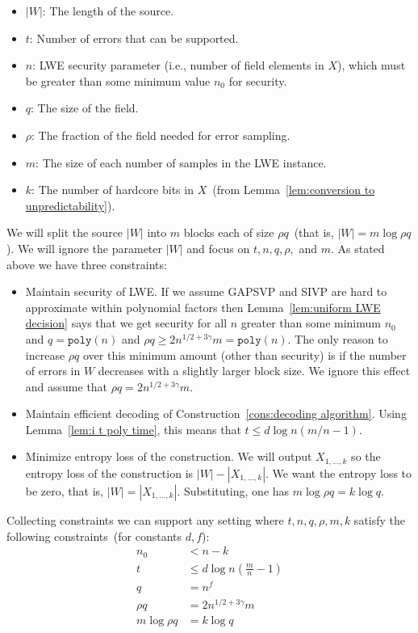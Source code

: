 \documentclass[11pt]{article}
\newcommand{\lemref}[1]{\mbox{Lemma~\ref{#1}}}
\newcommand{\poly}{\ensuremath{\mathtt{poly}}\xspace}
\begin{document}
\begin{itemize}
\item $|W|$: The length of the source.  
\item $t$: Number of errors that can be supported.  
\item $n$: LWE security parameter (i.e., number of field elements in $X$), which must be greater than some minimum value $n_0$ for security.
\item $q$: The size of the field.  
\item $\rho$: The fraction of the field needed for error sampling.  
\item $m$: The size of each number of samples in the LWE instance.  
\item $k$: The number of hardcore bits in $X$~(from \lemref{lem:conversion to unpredictability}).
\end{itemize}
We will split the source $|W|$ into $m$ blocks each of size $\rho q$~(that is, $|W| = m\log \rho q$).  We will ignore the parameter $|W|$ and focus on $t, n, q, \rho,$ and $m$.  As stated above we have three constraints:
\begin{itemize}
\item Maintain security of LWE.  If we assume GAPSVP and SIVP are hard to approximate within polynomial factors then \lemref{lem:uniform LWE decision} says that we get security for all $n$ greater than some minimum $n_0$ and $q = \poly(n)$ and $\rho q \geq 2 n^{1/2 + 3\gamma} m = \poly(n)$.  The only reason to increase $\rho q$ over this minimum amount (other than security) is if the number of errors in $W$ decreases with a slightly larger block size.  We ignore this effect and assume that $\rho q = 2n^{1/2+3\gamma}m$.
\item Maintain efficient decoding of Construction~\ref{cons:decoding algorithm}.  Using \lemref{lem:i t poly time}, this means that $t\leq d\log n(m/n-1)$.
\item Minimize entropy loss of the construction.  We will output $X_{1,...,k}$ so the entropy loss of the construction is $|W|-|X_{1,..., k}|$.  We want the entropy loss to be zero, that is, $|W| = |X_{1,..., k}|$.  Substituting, one has $m\log \rho q = k \log q$.
\end{itemize}
Collecting constraints we can support any setting where $t, n, q, \rho, m, k$ satisfy the following constraints~(for constants $d, f$):
\begin{align*}
n_0&< n -k \\
t&\leq d \log n\left(\frac{m}{n}-1\right)\\
q &= n^f\\
\rho q  &= 2n^{1/2+3\gamma}m\\
m\log \rho q &= k \log q
\end{align*}
\end{document}
